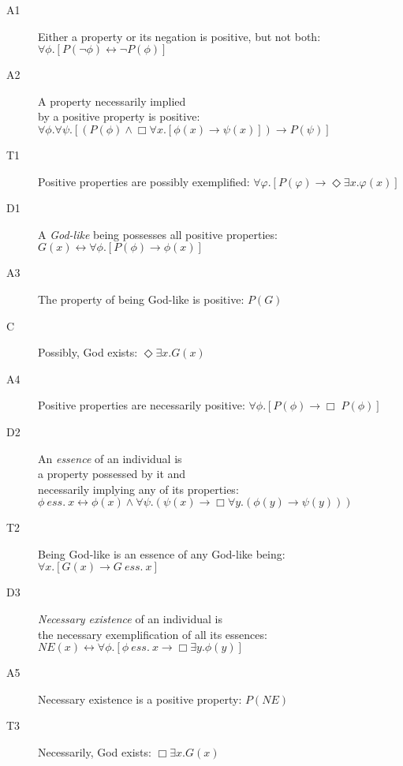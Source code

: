 \documentclass{llncs}
\newcommand{\imp}{\rightarrow}
\newcommand{\biimp}{\leftrightarrow}
\newcommand{\all}{\forall}
\newcommand{\ex}{\exists}
\newcommand{\nec}{\Box} %
\newcommand{\pos}{\Diamond} %
\newcommand{\ess}[2]{#1 \ \mathit{ess.} \ #2}
\newcommand{\NE}{\mathit{NE}}
\begin{document}
\allowdisplaybreaks[1] 
\begin{description}
\item[A1] Either a property or its negation is positive, but not
  both:  \hfill 
  $\all \phi. [P(\neg \phi) \biimp \neg P(\phi)]$
\item[A2] A property necessarily implied \\ by a
  positive property is positive: \phantom{b} \hfill 
  $\all \phi. \all \psi.[(P(\phi) \wedge \nec \all x.[\phi(x)
  \imp \psi(x)]) \imp P(\psi)]$ 
\item[T1] Positive properties are possibly exemplified: \hfill $\all \varphi. [P(\varphi) \imp \pos \ex x.\varphi(x)]$
\item[D1] A \emph{God-like} being possesses all positive properties: \hfill
  $G(x) \biimp \forall \phi. [P(\phi) \to \phi(x)]$
\item[A3]  The property of being God-like is positive: \hfill   $P(G)$
\item[C\phantom{1}] Possibly, God exists: \hfill $\pos \ex x. G(x)$
\item[A4]  Positive properties are necessarily positive: \hfill 
  $\all \phi.[P(\phi) \to \Box \; P(\phi)]$
\item[D2] An \emph{essence} of an individual is  \\ a property possessed by it and \\ necessarily implying any of its properties:
  \phantom{b} \hfill $\ess{\phi}{x} \biimp \phi(x) \wedge \all
  \psi. (\psi(x) \imp \nec \all y. (\phi(y) \imp \psi(y)))$
\item[T2]  Being God-like is an essence of any
  God-like being: \hfill $\all x.[G(x) \imp \ess{G}{x}]$ 
\item[D3] \emph{Necessary existence} of an individual is \\ the necessary exemplification of all its essences: 
  \phantom{b} \hfill $\NE(x) \biimp \all \phi.[\ess{\phi}{x} \imp \nec \ex y.\phi(y)]$
\item[A5] Necessary existence is a positive property: \hfill $P(\NE)$
\item[T3] Necessarily, God exists: \hfill $\nec \ex x. G(x)$ 
\end{description}
\end{document}
